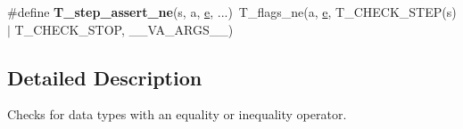 \begin{DoxyCompactItemize}
\item 
\mbox{\label{group__RTEMSTestFrameworkChecksGeneric_gae7623943a4a14e3dd9f25976fcdacb4a}} 
\#define {\bfseries T\+\_\+step\+\_\+assert\+\_\+ne}(s,  a,  \mbox{\hyperlink{sun4u_2tte_8h_a8b0b9ed08e0e18920ec2682f48228c27}{e}}, ...)~T\+\_\+flags\+\_\+ne(a, \mbox{\hyperlink{sun4u_2tte_8h_a8b0b9ed08e0e18920ec2682f48228c27}{e}}, T\+\_\+\+C\+H\+E\+C\+K\+\_\+\+S\+T\+EP(s) $\vert$ T\+\_\+\+C\+H\+E\+C\+K\+\_\+\+S\+T\+OP, \+\_\+\+\_\+\+V\+A\+\_\+\+A\+R\+G\+S\+\_\+\+\_\+)
\end{DoxyCompactItemize}


\subsection{Detailed Description}
Checks for data types with an equality or inequality operator. 

